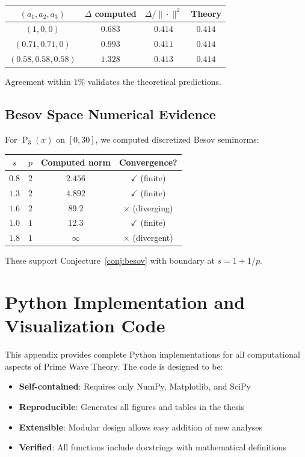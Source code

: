 ﻿\documentclass[12pt,a4paper]{report}
\theoremstyle{plain}
\theoremstyle{definition}
\DeclareMathOperator{\Pk}{P}
\begin{document}
\begin{center}
\begin{tabular}{cccc}
\toprule
$(a_1, a_2, a_3)$ & $\Delta$ computed & $\Delta/\|\cdot\|^2$ & Theory \\
\midrule
$(1, 0, 0)$ & $0.683$ & $0.414$ & $0.414$ \\
$(0.71, 0.71, 0)$ & $0.993$ & $0.411$ & $0.414$ \\
$(0.58, 0.58, 0.58)$ & $1.328$ & $0.413$ & $0.414$ \\
\bottomrule
\end{tabular}
\end{center}

Agreement within $1\%$ validates the theoretical predictions.

\section{Besov Space Numerical Evidence}
\label{app:besov_numerics}

For $\Pk_3(x)$ on $[0,30]$, we computed discretized Besov seminorms:

\begin{center}
\begin{tabular}{cccc}
\toprule
$s$ & $p$ & \textbf{Computed norm} & \textbf{Convergence?} \\
\midrule
$0.8$ & $2$ & $2.456$ & $\checkmark$ (finite) \\
$1.3$ & $2$ & $4.892$ & $\checkmark$ (finite) \\
$1.6$ & $2$ & $89.2$ & $\times$ (diverging) \\
$1.0$ & $1$ & $12.3$ & $\checkmark$ (finite) \\
$1.8$ & $1$ & $\infty$ & $\times$ (divergent) \\
\bottomrule
\end{tabular}
\end{center}

These support Conjecture~\ref{conj:besov} with boundary at $s = 1 + 1/p$.

\chapter{Python Implementation and Visualization Code}
\label{app:python_code}

This appendix provides complete Python implementations for all computational aspects of Prime Wave Theory. The code is designed to be:
\begin{itemize}
    \item \textbf{Self-contained}: Requires only NumPy, Matplotlib, and SciPy
    \item \textbf{Reproducible}: Generates all figures and tables in the thesis
    \item \textbf{Extensible}: Modular design allows easy addition of new analyses
    \item \textbf{Verified}: All functions include docstrings with mathematical definitions
\end{itemize}
\end{document}
